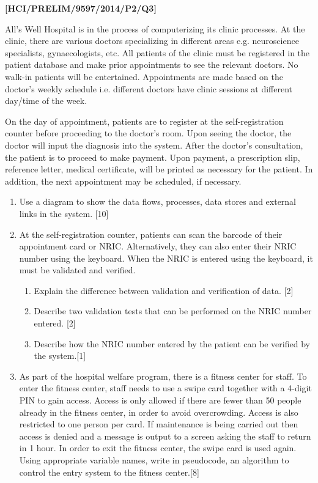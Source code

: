 \item \textbf{{[}HCI/PRELIM/9597/2014/P2/Q3{]} }

All\textquoteright s Well Hospital is in the process of computerizing
its clinic processes. At the clinic, there are various doctors specializing
in different areas e.g. neuroscience specialists, gynaecologists,
etc. All patients of the clinic must be registered in the patient
database and make prior appointments to see the relevant doctors.
No walk-in patients will be entertained. Appointments are made based
on the doctor\textquoteright s weekly schedule i.e. different doctors
have clinic sessions at different day/time of the week. 

On the day of appointment, patients are to register at the self-registration
counter before proceeding to the doctor\textquoteright s room. Upon
seeing the doctor, the doctor will input the diagnosis into the system.
After the doctor\textquoteright s consultation, the patient is to
proceed to make payment. Upon payment, a prescription slip, reference
letter, medical certificate, will be printed as necessary for the
patient. In addition, the next appointment may be scheduled, if necessary. 
\begin{enumerate}
\item Use a diagram to show the data flows, processes, data stores and external
links in the system. \hfill{}{[}10{]}
\item At the self-registration counter, patients can scan the barcode of
their appointment card or NRIC. Alternatively, they can also enter
their NRIC number using the keyboard. When the NRIC is entered using
the keyboard, it must be validated and verified. 
\begin{enumerate}
\item Explain the difference between validation and verification of data.
\hfill{}{[}2{]}
\item Describe two validation tests that can be performed on the NRIC number
entered. \hfill{}{[}2{]}
\item Describe how the NRIC number entered by the patient can be verified
by the system.\hfill{}{[}1{]}
\end{enumerate}
\item As part of the hospital welfare program, there is a fitness center
for staff. To enter the fitness center, staff needs to use a swipe
card together with a 4-digit PIN to gain access. Access is only allowed
if there are fewer than 50 people already in the fitness center, in
order to avoid overcrowding. Access is also restricted to one person
per card. If maintenance is being carried out then access is denied
and a message is output to a screen asking the staff to return in
1 hour. In order to exit the fitness center, the swipe card is used
again. Using appropriate variable names, write in pseudocode, an algorithm
to control the entry system to the fitness center.\hfill{}{[}8{]}
\end{enumerate}